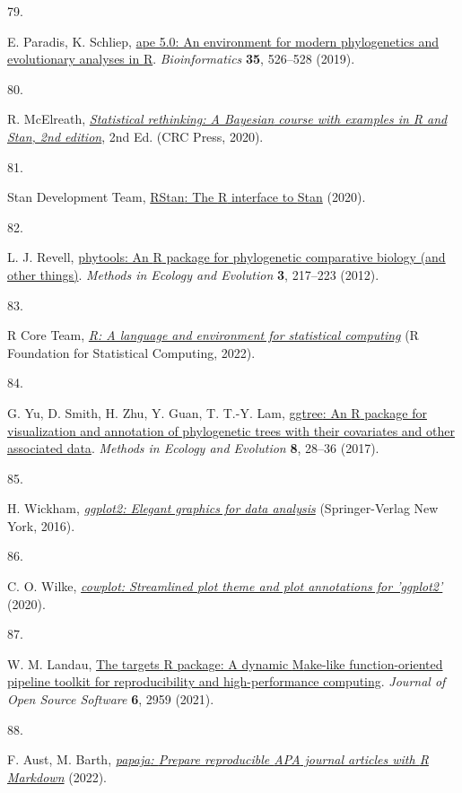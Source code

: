 \documentclass[
  man, donotrepeattitle,floatsintext]{apa6}
\newlength{\cslhangindent}
\newlength{\csllabelwidth}
\newlength{\cslentryspacingunit} %
\newenvironment{CSLReferences}[2] %
 {%
  \setlength{\parindent}{0pt}
  \ifodd #1
  \let\oldpar\par
  \def\par{\hangindent=\cslhangindent\oldpar}
  \fi
  \setlength{\parskip}{#2\cslentryspacingunit}
 }%
 {}
\newcommand{\CSLLeftMargin}[1]{\parbox[t]{\csllabelwidth}{#1}}
\newcommand{\CSLRightInline}[1]{\parbox[t]{\linewidth - \csllabelwidth}{#1}\break}
\begin{document}
\begin{CSLReferences}{0}{0}
\leavevmode{}%
\CSLLeftMargin{79. }%
\CSLRightInline{E. Paradis, K. Schliep, \href{https://doi.org/10.1093/bioinformatics/bty633}{{ape} 5.0: An environment for modern phylogenetics and evolutionary analyses in {R}}. \emph{Bioinformatics} \textbf{35}, 526--528 (2019).}

\leavevmode{}%
\CSLLeftMargin{80. }%
\CSLRightInline{R. McElreath, \emph{\href{http://xcelab.net/rm/statistical-rethinking/}{Statistical rethinking: A {Bayesian} course with examples in {R} and {Stan}, 2nd edition}}, 2nd Ed. (CRC Press, 2020).}

\leavevmode{}%
\CSLLeftMargin{81. }%
\CSLRightInline{Stan Development Team, \href{http://mc-stan.org/}{{RStan}: The {R} interface to {Stan}} (2020).}

\leavevmode{}%
\CSLLeftMargin{82. }%
\CSLRightInline{L. J. Revell, \href{https://doi.org/10.1111/j.2041-210X.2011.00169.x}{{phytools}: An {R} package for phylogenetic comparative biology (and other things)}. \emph{Methods in Ecology and Evolution} \textbf{3}, 217--223 (2012).}

\leavevmode{}%
\CSLLeftMargin{83. }%
\CSLRightInline{R Core Team, \emph{\href{https://www.R-project.org/}{R: A language and environment for statistical computing}} (R Foundation for Statistical Computing, 2022).}

\leavevmode{}%
\CSLLeftMargin{84. }%
\CSLRightInline{G. Yu, D. Smith, H. Zhu, Y. Guan, T. T.-Y. Lam, \href{https://doi.org/10.1111/2041-210X.12628}{{ggtree}: An {R} package for visualization and annotation of phylogenetic trees with their covariates and other associated data}. \emph{Methods in Ecology and Evolution} \textbf{8}, 28--36 (2017).}

\leavevmode{}%
\CSLLeftMargin{85. }%
\CSLRightInline{H. Wickham, \emph{\href{https://ggplot2.tidyverse.org}{{ggplot2}: Elegant graphics for data analysis}} (Springer-Verlag New York, 2016).}

\leavevmode{}%
\CSLLeftMargin{86. }%
\CSLRightInline{C. O. Wilke, \emph{\href{https://CRAN.R-project.org/package=cowplot}{{cowplot}: Streamlined plot theme and plot annotations for 'ggplot2'}} (2020).}

\leavevmode{}%
\CSLLeftMargin{87. }%
\CSLRightInline{W. M. Landau, \href{https://doi.org/10.21105/joss.02959}{The targets {R} package: A dynamic {M}ake-like function-oriented pipeline toolkit for reproducibility and high-performance computing}. \emph{Journal of Open Source Software} \textbf{6}, 2959 (2021).}

\leavevmode{}%
\CSLLeftMargin{88. }%
\CSLRightInline{F. Aust, M. Barth, \emph{\href{https://github.com/crsh/papaja}{{papaja}: {Prepare} reproducible {APA} journal articles with {R Markdown}}} (2022).}

\end{CSLReferences}
\end{document}
